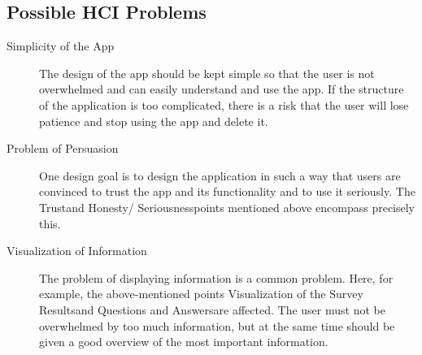 \documentclass[11pt]{article}
\begin{document}

\subsection{Possible HCI Problems}
\begin{description}
    \item[Simplicity of the App] The design of the app should be kept simple so that the user is not overwhelmed and can easily understand and use the app. If the structure of the application is too complicated, there is a risk that the user will lose patience and stop using the app and delete it. 

    \item[Problem of Persuasion] One design goal is to design the application in such a way that users are convinced to trust the app and its functionality and to use it seriously. The \ldq Trust\rdq and \ldq Honesty/ Seriousness\rdq points mentioned above encompass precisely this.
    
    \item[Visualization of Information] The problem of displaying information is a common problem. Here, for example, the above-mentioned points \ldq Visualization of the Survey Results\rdq and \ldq Questions and Answers\rdq are affected. The user must not be overwhelmed by too much information, but at the same time should be given a good overview of the most important information.
\end{description}


\printbibliography
\end{document}
